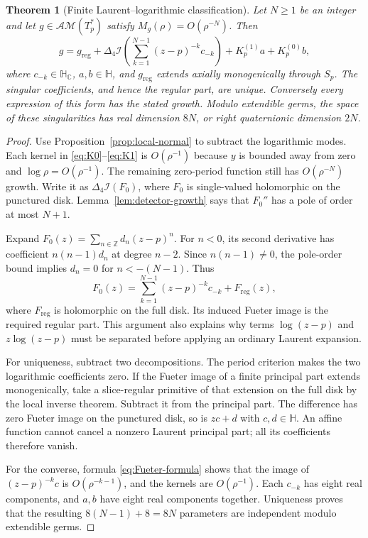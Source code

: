 \documentclass[11pt,a4paper]{article}
\numberwithin{equation}{section}
\newtheorem{theorem}{Theorem}[section]
\theoremstyle{definition}
\theoremstyle{remark}
\newcommand{\C}{\mathbb C}
\newcommand{\HH}{\mathbb H}
\newcommand{\HC}{\mathbb H_{\C}}
\newcommand{\AM}{\mathcal{AM}}
\newcommand{\cI}{\mathcal I}
\newcommand{\lap}{\Delta_4}
\newcommand{\Kzero}{K_p^{(0)}}
\newcommand{\Kone}{K_p^{(1)}}
\begin{document}
\begin{theorem}[Finite Laurent--logarithmic classification]
\label{thm:laurent-log}
Let $N\geq1$ be an integer and let $g\in\AM(T_p^*)$ satisfy
$M_g(\rho)=O(\rho^{-N})$. Then
\begin{equation}\label{eq:finite-normal}
 \boxed{\displaystyle
 g=g_{\mathrm{reg}}+
   \lap\cI\left(\sum_{k=1}^{N-1}(z-p)^{-k}c_{-k}\right)
   +\Kone a+\Kzero b,}
\end{equation}
where $c_{-k}\in\HC$, $a,b\in\HH$, and $g_{\mathrm{reg}}$ extends axially
monogenically through $S_p$. The singular coefficients, and hence the regular
part, are unique. Conversely every expression of this form has the stated
growth. Modulo extendible germs, the space of these singularities has real
dimension $8N$, or right quaternionic dimension $2N$.
\end{theorem}
\begin{proof}
Use Proposition~\ref{prop:local-normal} to subtract the logarithmic modes.
Each kernel in \eqref{eq:K0}--\eqref{eq:K1} is $O(\rho^{-1})$ because $y$
is bounded away from zero and $\log\rho=O(\rho^{-1})$. The remaining
zero-period function still has $O(\rho^{-N})$ growth. Write it as
$\lap\cI(F_0)$, where $F_0$ is single-valued holomorphic on the punctured disk.
Lemma~\ref{lem:detector-growth} says that $F_0''$ has a pole of order at most
$N+1$.

Expand $F_0(z)=\sum_{n\in\mathbb Z}d_n(z-p)^n$. For $n<0$, its second
derivative has coefficient $n(n-1)d_n$ at degree $n-2$. Since $n(n-1)\ne0$,
the pole-order bound implies $d_n=0$ for $n<-(N-1)$. Thus
\[
 F_0(z)=\sum_{k=1}^{N-1}(z-p)^{-k}c_{-k}+F_{\mathrm{reg}}(z),
\]
where $F_{\mathrm{reg}}$ is holomorphic on the full disk. Its induced Fueter
image is the required regular part. This argument also explains why terms
$\log(z-p)$ and $z\log(z-p)$ must be separated before applying an ordinary
Laurent expansion.

For uniqueness, subtract two decompositions. The period criterion makes the
two logarithmic coefficients zero. If the Fueter image of a finite principal
part extends monogenically, take a slice-regular primitive of that extension
on the full disk by the local inverse theorem. Subtract it from the principal
part. The difference has zero Fueter image on the punctured disk, so is
$zc+d$ with $c,d\in\HH$. An affine function cannot cancel a nonzero Laurent
principal part; all its coefficients therefore vanish.

For the converse, formula \eqref{eq:Fueter-formula} shows that the image of
$(z-p)^{-k}c$ is $O(\rho^{-k-1})$, and the kernels are
$O(\rho^{-1})$. Each $c_{-k}$ has eight real components, and $a,b$ have eight
real components together. Uniqueness proves that the resulting
$8(N-1)+8=8N$ parameters are independent modulo extendible germs.
\end{proof}
\end{document}
